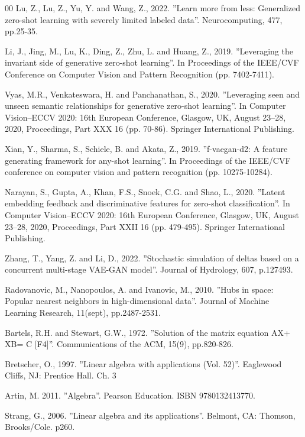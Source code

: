 \documentclass{article}
\begin{document}
\begin{thebibliography}{00}
 Lu, Z., Lu, Z., Yu, Y. and Wang, Z., 2022. ''Learn more from less: Generalized zero-shot learning with severely limited labeled data''. Neurocomputing, 477, pp.25-35.

 Li, J., Jing, M., Lu, K., Ding, Z., Zhu, L. and Huang, Z., 2019. ''Leveraging the invariant side of generative zero-shot learning''. In Proceedings of the IEEE/CVF Conference on Computer Vision and Pattern Recognition (pp. 7402-7411).

 Vyas, M.R., Venkateswara, H. and Panchanathan, S., 2020. ''Leveraging seen and unseen semantic relationships for generative zero-shot learning''. In Computer Vision–ECCV 2020: 16th European Conference, Glasgow, UK, August 23–28, 2020, Proceedings, Part XXX 16 (pp. 70-86). Springer International Publishing.

 Xian, Y., Sharma, S., Schiele, B. and Akata, Z., 2019. ''f-vaegan-d2: A feature generating framework for any-shot learning''. In Proceedings of the IEEE/CVF conference on computer vision and pattern recognition (pp. 10275-10284).

 Narayan, S., Gupta, A., Khan, F.S., Snoek, C.G. and Shao, L., 2020. ''Latent embedding feedback and discriminative features for zero-shot classification''. In Computer Vision–ECCV 2020: 16th European Conference, Glasgow, UK, August 23–28, 2020, Proceedings, Part XXII 16 (pp. 479-495). Springer International Publishing.

 Zhang, T., Yang, Z. and Li, D., 2022. ''Stochastic simulation of deltas based on a concurrent multi-stage VAE-GAN model''. Journal of Hydrology, 607, p.127493.

 Radovanovic, M., Nanopoulos, A. and Ivanovic, M., 2010. ''Hubs in space: Popular nearest neighbors in high-dimensional data''. Journal of Machine Learning Research, 11(sept), pp.2487-2531.

 Bartels, R.H. and Stewart, G.W., 1972. ''Solution of the matrix equation AX+ XB= C [F4]''. Communications of the ACM, 15(9), pp.820-826.

 Bretscher, O., 1997. ''Linear algebra with applications (Vol. 52)''. Eaglewood Cliffs, NJ: Prentice Hall. Ch. 3

 Artin, M. 2011. ''Algebra''. Pearson Education. ISBN 9780132413770.  

 Strang, G., 2006. ''Linear algebra and its applications''. Belmont, CA: Thomson, Brooks/Cole. p260.


\end{thebibliography}
\end{document}
